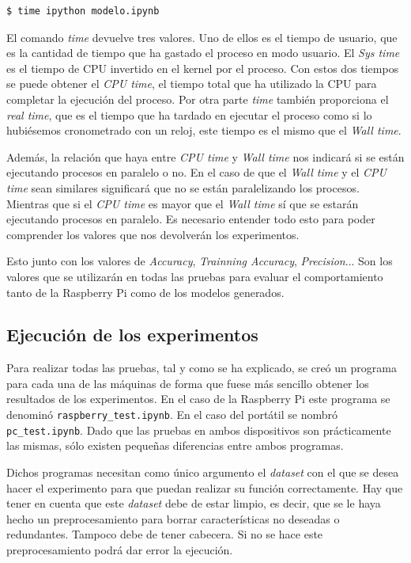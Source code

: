\documentclass[a4paper, 12pt]{book}
\begin{document}
\begin{lstlisting}[language=bash]
  $ time ipython modelo.ipynb
\end{lstlisting}

El comando \textit{time} devuelve tres valores. Uno de ellos es el tiempo de usuario, que es la cantidad de tiempo que ha gastado el proceso en modo usuario. El \textit{Sys time} es el tiempo de CPU invertido en el kernel por el proceso. Con estos dos tiempos se puede obtener el \textit{CPU time}, el tiempo total que ha utilizado la CPU para completar la ejecución del proceso. Por otra parte \textit{time} también proporciona el \textit{real time}, que es el tiempo que ha tardado en ejecutar el proceso como si lo hubiésemos cronometrado con un reloj, este tiempo es el mismo que el \textit{Wall time}. 

Además, la relación que haya entre \textit{CPU time} y \textit{Wall time} nos indicará si se están ejecutando procesos en paralelo o no. En el caso de que el \textit{Wall time} y el \textit{CPU time} sean similares significará que no se están paralelizando los procesos. Mientras que si el \textit{CPU time} es mayor que el \textit{Wall time} sí que se estarán ejecutando procesos en paralelo\cite{timeDoc}. Es necesario entender todo esto para poder comprender los valores que nos devolverán los experimentos.

Esto junto con los valores de \textit{Accuracy}, \textit{Trainning Accuracy}, \textit{Precision}... Son los valores que se utilizarán en todas las pruebas para evaluar el comportamiento tanto de la Raspberry Pi como de los modelos generados.

\subsection{Ejecución de los experimentos}
\label{subsec:ejecucion_experimentos}

Para realizar todas las pruebas, tal y como se ha explicado, se creó un programa para cada una de las máquinas de forma que fuese más sencillo obtener los resultados de los experimentos. En el caso de la Raspberry Pi este programa se denominó \texttt{raspberry\_test.ipynb}. En el caso del portátil se nombró \texttt{pc\_test.ipynb}. Dado que las pruebas en ambos dispositivos son prácticamente las mismas, sólo existen pequeñas diferencias entre ambos programas.

Dichos programas necesitan como único argumento el \textit{dataset} con el que se desea hacer el experimento para que puedan realizar su función correctamente.
Hay que tener en cuenta que este \textit{dataset} debe de estar limpio, es decir, que se le haya hecho un preprocesamiento para borrar características no deseadas o redundantes. Tampoco debe de tener cabecera. Si no se hace este preprocesamiento podrá dar error la ejecución.
\end{document}
